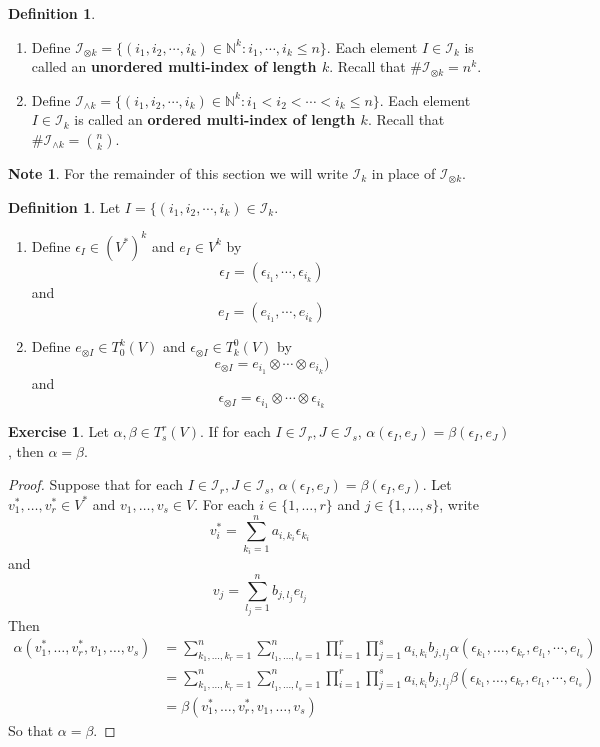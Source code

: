 \documentclass[12pt]{amsart}
\theoremstyle{definition}
\newtheorem{defn}[definition]{Definition}
\newtheorem{note}[definition]{Note}
\theoremstyle{definition}
\newtheorem{ex}[definition]{Exercise}
\newcommand{\al}{\alpha}
\newcommand{\bet}{\beta}
\newcommand{\ep}{\epsilon}
\newcommand{\N}{\mathbb{N}}
\newcommand{\MI}{\mathcal{I}}
\begin{document}
	
	\begin{defn}\
		\begin{enumerate}
		\item Define $\MI_{\otimes k} = \{(i_1, i_2, \cdots, i_k) \in \N^k: i_1,  \cdots,  i_k \leq n \}$. Each element $I \in \MI_{k}$ is called an \textbf{unordered multi-index of length $k$}. Recall that $\# \MI_{\otimes k} = n^k$. \\
		\item Define $\MI_{\wedge k} = \{(i_1, i_2, \cdots, i_k) \in \N^k: i_1 < i_2 < \cdots < i_k \leq n \}$. Each element $I \in \MI_{k}$ is called an \textbf{ordered multi-index of length $k$}. Recall that $\# \MI_{\wedge k} = {n \choose k}$. 
		\end{enumerate}
	\end{defn}
	
	\begin{note}
	For the remainder of this section we will write $\MI_k$ in place of $\MI_{\otimes k}$.
	\end{note}

	\begin{defn}
		Let $I = \{(i_1, i_2, \cdots, i_k) \in \MI_k$. \\ 
		\begin{enumerate}
		\item Define $\ep_I \in (V^*)^k$ and $e_I \in V^k$  by  $$\ep_I = (\ep_{i_1}, \cdots, \ep_{i_k})$$ 
		and 
		$$e_I = (e_{i_1}, \cdots, e_{i_k})$$ 
		\item Define $e_{\otimes I} \in T^k_0(V)$ and $\ep_{\otimes I} \in T^0_k(V)$ by 
		$$e_{\otimes I} = e_{i_1} \otimes \cdots \otimes e_{i_k})$$ 
		and 
		$$\ep_{\otimes I} = \ep_{i_1} \otimes \cdots \otimes \ep_{i_k}$$
		\end{enumerate}
	\end{defn}
	
	\begin{ex}
	Let $\al, \bet \in T^r_s(V)$. If for each $I \in \MI_r, J \in \MI_s$, $\al(\ep_I, e_J) = \bet(\ep_I, e_J)$, then $\al = \bet$.
	\end{ex}
	
	\begin{proof}
	Suppose that for each $I \in \MI_r, J \in \MI_s$, $\al(\ep_I, e_J) = \bet(\ep_I, e_J)$. Let $v^*_1, \dots, v^*_r \in V^*$ and $v_1, \dots, v_s \in V$. For each $i \in \{1, \dots, r\}$ and $j \in \{1, \dots, s\}$, write $$v^*_i = \sum\limits_{k_i = 1}^n a_{i, k_i} \ep_{k_i}$$ and $$v_j = \sum\limits_{l_j = 1}^n b_{j, l_j} e_{l_j}$$
	Then 
	\begin{align*}
	\al(v^*_1, \dots, v^*_r, v_1, \dots, v_s)
	&= \sum_{k_1, \dots, k_r =1}^n \sum_{l_1, \dots, l_s = 1}^n \prod_{i=1}^r \prod_{j=1}^s a_{i, k_i} b_{j, l_j} \al(\ep_{k_1}, \dots, \ep_{k_r}, e_{l_1}, \cdots, e_{l_s}) \\
	&= \sum_{k_1, \dots, k_r =1}^n \sum_{l_1, \dots, l_s = 1}^n \prod_{i=1}^r \prod_{j=1}^s a_{i, k_i} b_{j, l_j} \bet(\ep_{k_1}, \dots, \ep_{k_r}, e_{l_1}, \cdots, e_{l_s}) \\
	&= \bet(v^*_1, \dots, v^*_r, v_1, \dots, v_s)
	\end{align*}
	So that $\al = \bet$.
	\end{proof}
		
\end{document}
